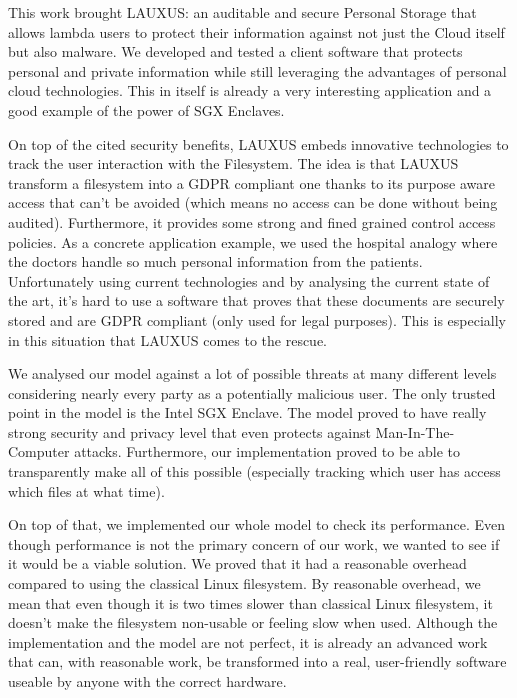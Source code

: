 \documentclass[../main.tex]{subfiles}
\begin{document}
\par This work brought LAUXUS: an auditable and secure Personal Storage that allows lambda users to protect their information against not just the Cloud itself but also malware. We developed and tested a client software that protects personal and private information while still leveraging the advantages of personal cloud technologies. This in itself is already a very interesting application and a good example of the power of SGX Enclaves.
\par On top of the cited security benefits, LAUXUS embeds innovative technologies to track the user interaction with the Filesystem. The idea is that LAUXUS transform a filesystem into a GDPR compliant one thanks to its purpose aware access that can't be avoided (which means no access can be done without being audited). Furthermore, it provides some strong and fined grained control access policies. As a concrete application example, we used the hospital analogy where the doctors handle so much personal information from the patients. Unfortunately using current technologies and by analysing the current state of the art, it's hard to use a software that proves that these documents are securely stored and are GDPR compliant (only used for legal purposes). This is especially in this situation that LAUXUS comes to the rescue.

\medbreak
\par We analysed our model against a lot of possible threats at many different levels considering nearly every party as a potentially malicious user. The only trusted point in the model is the Intel SGX Enclave. The model proved to have really strong security and privacy level that even protects against Man-In-The-Computer attacks. Furthermore, our implementation proved to be able to transparently make all of this possible (especially tracking which user has access which files at what time).
\par On top of that, we implemented our whole model to check its performance. Even though performance is not the primary concern of our work, we wanted to see if it would be a viable solution. We proved that it had a reasonable overhead compared to using the classical Linux filesystem. By reasonable overhead, we mean that even though it is two times slower than classical Linux filesystem, it doesn't make the filesystem non-usable or feeling slow when used. Although the implementation and the model are not perfect, it is already an advanced work that can, with reasonable work, be transformed into a real, user-friendly software useable by anyone with the correct hardware.
\end{document}
